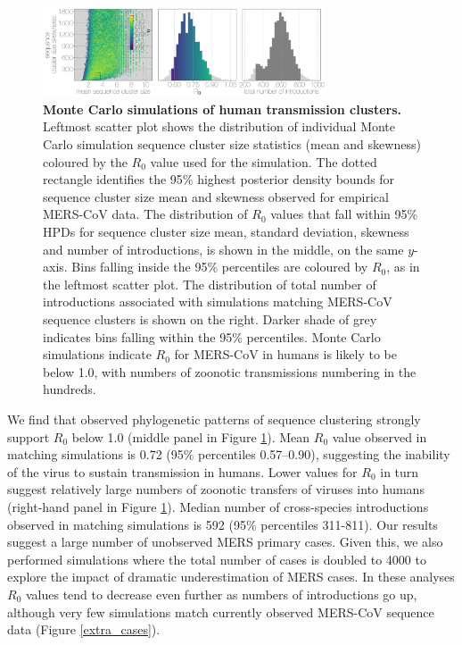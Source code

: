\documentclass[9pt,lineno]{elife}
\begin{document}
\begin{figure}[h]
\centering
	\includegraphics[width=0.75\textwidth]{figures/mers_epi.png}
	\caption{\textbf{Monte Carlo simulations of human transmission clusters.}
Leftmost scatter plot shows the distribution of individual Monte Carlo simulation sequence cluster size statistics (mean and skewness) coloured by the $R_{0}$ value used for the simulation.
The dotted rectangle identifies the 95\% highest posterior density bounds for sequence cluster size mean and skewness observed for empirical MERS-CoV data.
The distribution of $R_{0}$ values that fall within 95\% HPDs for sequence cluster size mean, standard deviation, skewness and number of introductions, is shown in the middle, on the same $y$-axis.
Bins falling inside the 95\% percentiles are coloured by $R_{0}$, as in the leftmost scatter plot.
The distribution of total number of introductions associated with simulations matching MERS-CoV sequence clusters is shown on the right.
Darker shade of grey indicates bins falling within the 95\% percentiles.
Monte Carlo simulations indicate $R_{0}$ for MERS-CoV in humans is likely to be below 1.0, with numbers of zoonotic transmissions numbering in the hundreds.
	}
	\label{mers_epi}
\end{figure}

We find that observed phylogenetic patterns of sequence clustering strongly support $R_{0}$ below 1.0 (middle panel in Figure \ref{mers_epi}).
Mean $R_{0}$ value observed in matching simulations is 0.72 (95\% percentiles 0.57--0.90), suggesting the inability of the virus to sustain transmission in humans.
Lower values for $R_{0}$ in turn suggest relatively large numbers of zoonotic transfers of viruses into humans (right-hand panel in Figure \ref{mers_epi}).
Median number of cross-species introductions observed in matching simulations is 592 (95\% percentiles 311-811).
Our results suggest a large number of unobserved MERS primary cases.
Given this, we also performed simulations where the total number of cases is doubled to 4000 to explore the impact of dramatic underestimation of MERS cases.
In these analyses $R_{0}$ values tend to decrease even further as numbers of introductions go up, although very few simulations match currently observed MERS-CoV sequence data (Figure \ref{extra_cases}).
\end{document}
